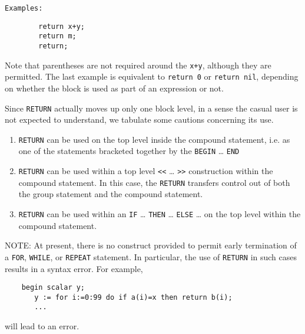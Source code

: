 \texttt{Examples:}
\begin{verbatim}
        return x+y;
        return m;
        return;
\end{verbatim}
Note that parentheses are not required around the \texttt{x+y}, although they
are permitted.  The last example is equivalent to \texttt{return 0} or 
\texttt{return nil}, depending on whether the block is used as part of an
expression or not.

Since \texttt{RETURN} actually moves up only one
block level, in a sense the casual user is not expected to
understand, we tabulate some cautions concerning its use.
\begin{enumerate}
\item \texttt{RETURN} can be used on the top level inside the compound
statement, i.e. as one of the statements bracketed together by the 
\texttt{BEGIN} \ldots{} \texttt{END}

\item \texttt{RETURN} can be used within a top level \texttt{<}\texttt{<}
  \ldots{} \texttt{>}\texttt{>} construction within the compound statement. In
  this case, the \texttt{RETURN} transfers control out of both the
  group statement and the compound statement.

\item \texttt{RETURN} can be used within an \texttt{IF} \ldots{}
  \texttt{THEN} \ldots{} \texttt{ELSE} \ldots{} on the top level within
  the compound statement.
\end{enumerate}
NOTE:  At present, there is no construct provided to permit early
termination of a \texttt{FOR}, \texttt{WHILE},
or \texttt{REPEAT} statement.  In particular, the use of
\texttt{RETURN} in such cases results in a syntax error.  For example,
\begin{verbatim}
    begin scalar y;
       y := for i:=0:99 do if a(i)=x then return b(i);
       ...
\end{verbatim}
will lead to an error.

